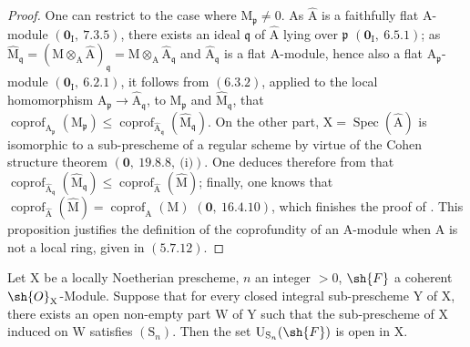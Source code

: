 \begin{proof}
One can restrict to the case where $\mathrm{M}_\mathfrak{p}\neq 0$. As $\widehat{\mathrm{A}}$ is a faithfully flat $\mathrm{A}$-module
$(\mathbf{0}_\mathrm{I},~7.3.5)$, there exists an ideal $\mathfrak{q}$ of $\widehat{\mathrm{A}}$ lying over $\mathfrak{p}$ $(\mathbf{0}_\mathrm{I},~6.5.1)$; as
$\widehat{\mathrm{M}}_\mathfrak{q}=(\mathrm{M}\otimes_\mathrm{A}\widehat{\mathrm{A}})_\mathfrak{q}=\mathrm{M}\otimes_\mathrm{A}\widehat{\mathrm{A}}_\mathfrak{q}$ and $\widehat{\mathrm{A}}_\mathfrak{q}$ is a flat $\mathrm{A}$-module, hence also a flat
$\mathrm{A}_\mathfrak{p}$-module
$(\mathbf{0}_\mathrm{I},~6.2.1)$, it follows from $(6.3.2)$, applied to the local homomorphism $\mathrm{A}_\mathfrak{p}\to\widehat{\mathrm{A}}_\mathfrak{q}$, to $\mathrm{M}_\mathfrak{p}$
and $\widehat{\mathrm{M}}_\mathfrak{q}$, that $\operatorname{coprof}_{\mathrm{A}_\mathfrak{p}}(\mathrm{M}_\mathfrak{p})\leqslant\operatorname{coprof}_{\widehat{\mathrm{A}}_\mathfrak{q}}(\widehat{\mathrm{M}}_\mathfrak{q})$. On the other part, $\mathrm{X}=\operatorname{Spec}(\widehat{\mathrm{A}})$
is isomorphic to a sub-prescheme of a regular scheme by virtue of the Cohen structure theorem
$(\mathbf{0},~19.8.8,~\text{(i)})$. One deduces therefore from  that $\operatorname{coprof}_{\widehat{\mathrm{A}}_\mathfrak{q}}(\widehat{\mathrm{M}}_\mathfrak{q})\leqslant\operatorname{coprof}_{\widehat{\mathrm{A}}}(\widehat{\mathrm{M}})$; finally,
one knows that $\operatorname{coprof}_{\widehat{\mathrm{A}}}(\widehat{\mathrm{M}})=\operatorname{coprof}_\mathrm{A}(\mathrm{M})$ $(\mathbf{0},~16.4.10)$, which finishes the proof of .
This proposition justifies the definition of the coprofundity of an $\mathrm{A}$-module when $\mathrm{A}$
is not a local ring, given in $(5.7.12)$.
\end{proof}

\begin{proposition}[6.11.6]
\label{IV.6.11.6}
Let $\mathrm{X}$ be a locally Noetherian prescheme, $n$ an integer $>0$, $\sh{F}$ a coherent $\sh{O}_\mathrm{X}$-Module.
Suppose that for every closed integral sub-prescheme $\mathrm{Y}$ of $\mathrm{X}$, there exists
an open non-empty part $\mathrm{W}$ of $\mathrm{Y}$ such that the sub-prescheme of $\mathrm{X}$ induced on $\mathrm{W}$ satisfies $(\mathrm{S}_n)$.
Then the set $\mathrm{U}_{\mathrm{S}_n}(\sh{F})$ is open in $\mathrm{X}$.
\end{proposition}

